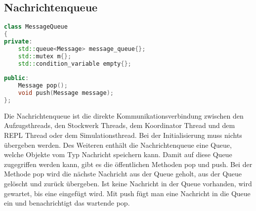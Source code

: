 \subsection{Nachrichtenqueue}

\begin{lstlisting}[language=C++]
class MessageQueue
{
private:
    std::queue<Message> message_queue{};
    std::mutex m{};
    std::condition_variable empty{};
    
public:
    Message pop();
    void push(Message message);
};
\end{lstlisting}

\vspace{5mm}

Die Nachrichtenqueue ist die direkte Kommunikationsverbindung zwischen den Aufzugsthreads, den Stockwerk Threads, dem Koordinator Thread und dem REPL Thread oder dem Simulationsthread. Bei der Initialisierung muss nichts übergeben werden. Des Weiteren enthält die Nachrichtenqueue eine Queue, welche Objekte vom Typ Nachricht speichern kann. Damit auf diese Queue zugegriffen werden kann, gibt es die öffentlichen Methoden pop und push. Bei der Methode pop wird die nächste Nachricht aus der Queue geholt, aus der Queue gelöscht und zurück übergeben. Ist keine Nachricht in der Queue vorhanden, wird gewartet, bis eine eingefügt wird. Mit push fügt man eine Nachricht in die Queue ein und benachrichtigt das wartende pop.